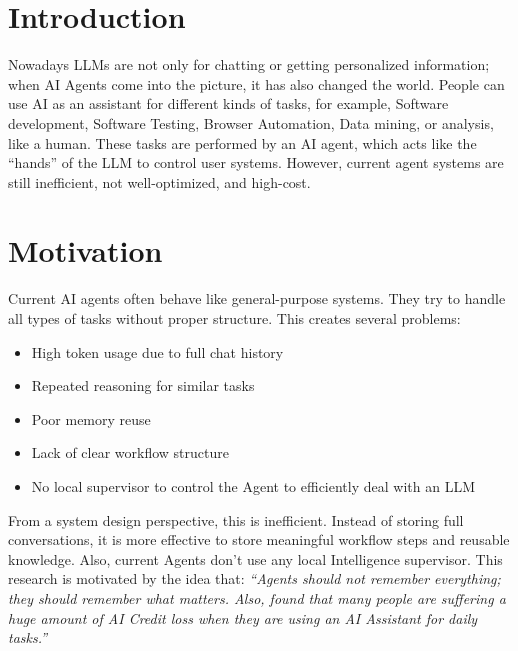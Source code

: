 \documentclass[12pt,a4paper]{article}
\begin{document}
\section{Introduction}
Nowadays LLMs are not only for chatting or getting personalized information; when AI Agents come into the picture, it has also changed the world. People can use AI as an assistant for different kinds of tasks, for example, Software development, Software Testing, Browser Automation, Data mining, or analysis, like a human. These tasks are performed by an AI agent, which acts like the ``hands'' of the LLM to control user systems. However, current agent systems are still inefficient, not well-optimized, and high-cost.

\section{Motivation}
Current AI agents often behave like general-purpose systems. They try to handle all types of tasks without proper structure. This creates several problems:
\begin{itemize}
    \item High token usage due to full chat history
    \item Repeated reasoning for similar tasks
    \item Poor memory reuse
    \item Lack of clear workflow structure
    \item No local supervisor to control the Agent to efficiently deal with an LLM
\end{itemize}

\noindent From a system design perspective, this is inefficient. Instead of storing full conversations, it is more effective to store meaningful workflow steps and reusable knowledge. Also, current Agents don't use any local Intelligence supervisor. This research is motivated by the idea that:
\textit{``Agents should not remember everything; they should remember what matters. Also, found that many people are suffering a huge amount of AI Credit loss when they are using an AI Assistant for daily tasks.''}
\end{document}
